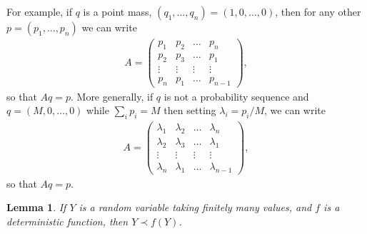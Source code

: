 \documentclass[11pt]{article}
\newtheorem{lem}[thm]{Lemma}
\newcommand{\1}{[1]}
\begin{document}
For example, if $q$ is a point mass, $(q_1, \dots, q_n) = (1,0,\dots,0)$, then for any other $p = (p_1, \dots, p_n)$ we can write
\begin{align}
    A = \left( \begin{array}{cccc}
    p_1 &p_2 &\dots &p_n \\
    p_2 &p_3 & \dots &p_{1} \\
    \vdots &\vdots & \vdots & \vdots \\
    p_n & p_1 & \dots & p_{n-1}
    \end{array} 
    \right),
\end{align}
so that $Aq = p$. More generally, if $q$ is not a probability sequence and $q = (M,0,\dots, 0)$ while $\sum_i p_i = M$ then setting $\lambda_i = p_i/M$, we can write
\begin{align} \label{eq: double stochastic matrix for point mass}
    A = \left( \begin{array}{cccc}
    \lambda_1 &\lambda_2 &\dots &\lambda_n \\
    \lambda_2 &\lambda_3 & \dots &\lambda_{1} \\
    \vdots &\vdots & \vdots & \vdots \\
    \lambda_n & \lambda_1 & \dots & \lambda_{n-1}
    \end{array} 
    \right),
\end{align}
so that $Aq = p$.


\begin{lem} \label{lem: majorization lemma}
If $Y$ is a random variable taking finitely many values, and $f$ is a deterministic function, then $Y \prec f(Y)$.
\end{lem}
\end{document}
